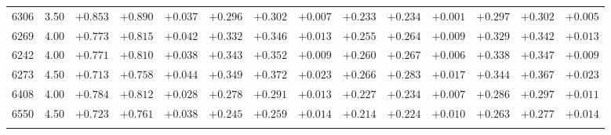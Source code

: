 \documentclass[]{aa}
\begin{document}
\begin{appendix}
\begin{table*}
\begin{center}
\begin{tabular}{llllllllllllll}
6306  &3.50 & $+0.853$ & $+0.890$ & $+0.037$ & $+0.296$ & $+0.302$ & $+0.007$ & $+0.233$ & $+0.234$ & $+0.001$ & $+0.297$ & $+0.302$ & $+0.005$ \\
6269  &4.00 & $+0.773$ & $+0.815$ & $+0.042$ & $+0.332$ & $+0.346$ & $+0.013$ & $+0.255$ & $+0.264$ & $+0.009$ & $+0.329$ & $+0.342$ & $+0.013$ \\
6242  &4.00 & $+0.771$ & $+0.810$ & $+0.038$ & $+0.343$ & $+0.352$ & $+0.009$ & $+0.260$ & $+0.267$ & $+0.006$ & $+0.338$ & $+0.347$ & $+0.009$ \\
6273  &4.50 & $+0.713$ & $+0.758$ & $+0.044$ & $+0.349$ & $+0.372$ & $+0.023$ & $+0.266$ & $+0.283$ & $+0.017$ & $+0.344$ & $+0.367$ & $+0.023$ \\
6408  &4.00 & $+0.784$ & $+0.812$ & $+0.028$ & $+0.278$ & $+0.291$ & $+0.013$ & $+0.227$ & $+0.234$ & $+0.007$ & $+0.286$ & $+0.297$ & $+0.011$ \\
6550  &4.50 & $+0.723$ & $+0.761$ & $+0.038$ & $+0.245$ & $+0.259$ & $+0.014$ & $+0.214$ & $+0.224$ & $+0.010$ & $+0.263$ & $+0.277$ & $+0.014$ \\
\hline\noalign{\smallskip}
\hline\noalign{\smallskip}
\end{tabular}
\end{center}
\end{table*}



\end{appendix}
\end{document}

